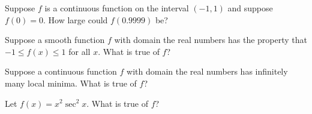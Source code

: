 \documentclass{ximera}
\newcommand{\recommendation}[1]{}
\begin{document}
\begin{shuffle}


\begin{problem}
  Suppose $f$ is a continuous function on the interval $(-1,1)$ and suppose $f(0) = 0$.  How large could $f(0.9999)$ be?
  \begin{multipleChoice}
  \end{multipleChoice}
\end{problem}

\begin{problem}
  Suppose a smooth function $f$ with domain the real numbers has the property that $-1 \leq f(x) \leq 1$ for all $x$.  What is true of $f$?
  \begin{multipleChoice}
  \end{multipleChoice}
\end{problem}

\begin{problem}
  Suppose a continuous function $f$ with domain the real numbers has infinitely many local minima.  What is true of $f$?
  \begin{multipleChoice}
  \end{multipleChoice}
\end{problem}

\begin{problem}
  Let $f(x) = x^2 \sec^2 x$.  What is true of $f$?
  \begin{multipleChoice}
  \end{multipleChoice}
\end{problem}


\end{shuffle}
\end{document}
